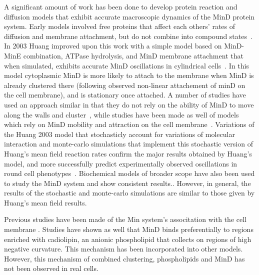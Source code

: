 \documentclass[letterpaper,twocolumn,amsmath,amssymb,pre]{revtex4-1}
\begin{document}
A significant amount of work has been done to develop protein reaction
and diffusion models that exhibit accurate macroscopic dynamics of the
MinD protein system. Early models involved free proteins that affect
each others' rates of diffusion and membrane attachment, but do not
combine into compound states~\cite{meinhardt2001pattern}.  In 2003
Huang improved upon this work with a simple model based on MinD-MinE
combination, ATPase hydrolysis, and MinD membrane attachment that when
simulated, exhibits accurate MinD oscillations in cylindrical
cells~\cite{huang2003dynamic}. In this model cytoplasmic MinD is more
likely to attach to the membrane when MinD is already clustered there
(following observed non-linear attachement of minD on the cell
membrane), and is stationary once attached.  A number of studies have
used an approach similar in that they do not rely on the ability of
MinD to move along the walls and
cluster~\cite{kruse2007experimentalist, meinhardt2001pattern,
  drew2005polymerization, fange2006noise, kerr2006division}, while
studies have been made as well of models which rely on MinD mobility
and attraction on the cell membrane~\cite{kruse2002dynamic,
  howard2005cellular}.  Variations of the Huang 2003 model that
stochasticly account for variations of molecular interaction
\cite{fange2006noise} and monte-carlo simulations that implement this
stochastic version of Huang's mean field reaction rates confirm the
major results obtained by Huang's model, and more successfully predict
experimentally observed oscillations in round cell
phenotypes~\cite{drew2005polymerization, fange2006noise,
  huang2004min}. Biochemical models of broader scope have also been
used to study the MinD system and show consistent
results.\cite{arjunan2010new}.  However, in general, the results of the
stochastic and monte-carlo simulations are similar to those given by
Huang's mean field results.

Previous studies have been made of the Min system's associtation with
the cell membrane
\cite{hsieh2010direct}\cite{mileykovskaya2003effects}.  Studies have
shown as well that MinD binds preferentially to regions enriched with
cadiolipin, an anionic phospholipid that collects on regions of high
negative curvature. This mechanism has been incorporated into other
models.\cite{drew2005polymerization,cytrynbaum2007multistranded,renner2012mind,renner2012mind}
However, this mechanism of combined clustering, phospholipids and MinD
has not been observed in real cells. \cite{halatek2012highly}
\end{document}
